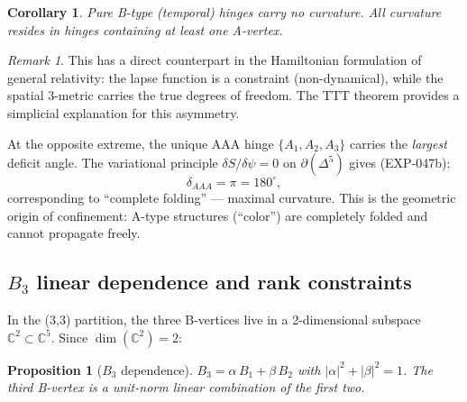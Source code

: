 \documentclass[12pt]{article}
\newtheorem{corollary}[theorem]{Corollary}
\newtheorem{proposition}[theorem]{Proposition}
\theoremstyle{remark}
\newtheorem{remark}[theorem]{Remark}
\theoremstyle{definition}
\begin{document}
\begin{corollary}
Pure B-type (temporal) hinges carry no curvature.  All curvature resides in hinges containing at least one A-vertex.
\end{corollary}

\begin{remark}
This has a direct counterpart in the Hamiltonian formulation of general relativity: the lapse function is a constraint (non-dynamical), while the spatial 3-metric carries the true degrees of freedom.  The TTT theorem provides a simplicial explanation for this asymmetry.
\end{remark}

At the opposite extreme, the unique AAA hinge $\{A_1, A_2, A_3\}$ carries the \emph{largest} deficit angle.  The variational principle $\delta S/\delta\psi = 0$ on $\partial(\Delta^5)$ gives (EXP-047b):
\begin{equation}
\delta_{AAA} = \pi = 180^\circ,
\end{equation}
corresponding to ``complete folding'' --- maximal curvature.  This is the geometric origin of confinement: A-type structures (``color'') are completely folded and cannot propagate freely.

\subsection{$B_3$ linear dependence and rank constraints}
\label{sec:B3_dependence}

In the (3,3) partition, the three B-vertices live in a 2-dimensional subspace $\mathbb{C}^2 \subset \mathbb{C}^5$.  Since $\dim(\mathbb{C}^2) = 2$:

\begin{proposition}[$B_3$ dependence]
\label{prop:B3}
$B_3 = \alpha\, B_1 + \beta\, B_2$ with $|\alpha|^2 + |\beta|^2 = 1$.  The third B-vertex is a unit-norm linear combination of the first two.
\end{proposition}
\end{document}
